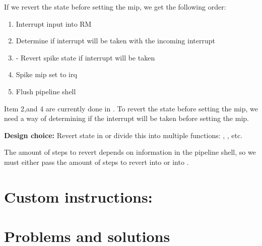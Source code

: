 If we revert the state before setting the mip, we get the following order:

\begin{enumerate}
    \item Interrupt input into RM
    \item Determine if interrupt will be taken with the incoming interrupt
    \item - Revert spike state if interrupt will be taken 
    \item Spike mip set to irq
    \item Flush pipeline shell
\end{enumerate}

Item 2,and 4 are currently done in .
To revert the state before setting the mip, we need a way of determining if the interrupt will be taken before setting the mip. 

\textbf{Design choice:} Revert state in  or divide this into multiple functions: , ,  etc.

The amount of steps to revert depends on information in the pipeline shell, so we must either pass the amount of steps to revert into  or into .

%

\section{Custom instructions:}




\section{Problems and solutions}

